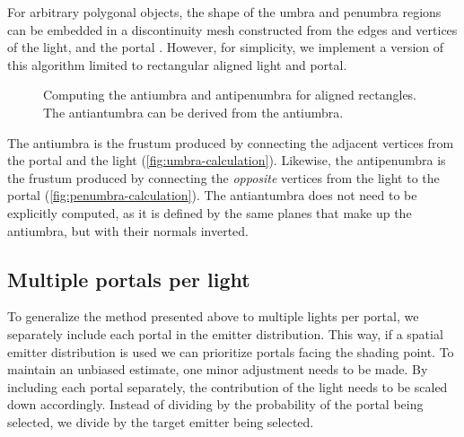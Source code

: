 For arbitrary polygonal objects, the shape of the umbra and penumbra regions can be embedded in a discontinuity mesh constructed from the edges and vertices of the light, and the portal \cite*{drettakisFastShadowAlgorithm1994}. However, for simplicity, we implement a version of this algorithm limited to rectangular aligned light and portal.

\begin{figure}[H]
  \centering
  \caption{Computing the antiumbra and antipenumbra for aligned rectangles. The antiantumbra can be derived from the antiumbra.}
\end{figure}

The antiumbra is the frustum produced by connecting the adjacent vertices from the portal and the light (\autoref{fig:umbra-calculation}). Likewise, the antipenumbra is the frustum produced by connecting the \emph{opposite} vertices from the light to the portal (\autoref{fig:penumbra-calculation}). The antiantumbra does not need to be explicitly computed, as it is defined by the same planes that make up the antiumbra, but with their normals inverted.

\subsection{Multiple portals per light}
To generalize the method presented above to multiple lights per portal, we separately include each portal in the emitter distribution. This way, if a spatial emitter distribution is used we can prioritize portals facing the shading point. To maintain an unbiased estimate, one minor adjustment needs to be made. By including each portal separately, the contribution of the light needs to be scaled down accordingly. Instead of dividing by the probability of the portal being selected, we divide by the target emitter being selected.